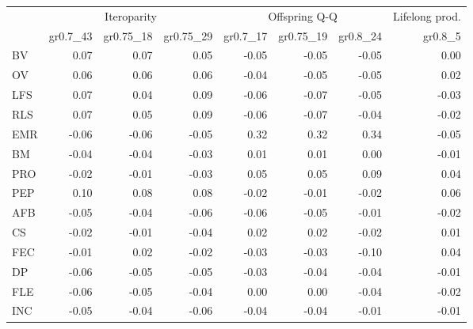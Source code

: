 \begin{landscape}
\begin{table}
\begin{footnotesize}
\begin{tabular}{@{}l|rrr|rrr|r@{}}
\toprule
 & \multicolumn{3}{c|}{Iteroparity} & \multicolumn{3}{c|}{Offspring Q-Q} & \multicolumn{1}{c}{Lifelong prod.}\\
 & gr0.7\_43 & gr0.75\_18 & gr0.75\_29 & gr0.7\_17 & gr0.75\_19 & gr0.8\_24 & gr0.8\_5\\
\midrule
BV & 0.07 & 0.07 & 0.05 & -0.05 & -0.05 & -0.05 & 0.00\\
OV & 0.06 & 0.06 & 0.06 & -0.04 & -0.05 & -0.05 & 0.02\\
LFS & 0.07 & 0.04 & 0.09 & -0.06 & -0.07 & -0.05 & -0.03\\
RLS & 0.07 & 0.05 & 0.09 & -0.06 & -0.07 & -0.04 & -0.02\\
EMR & -0.06 & -0.06 & -0.05 & 0.32 & 0.32 & 0.34 & -0.05\\
BM & -0.04 & -0.04 & -0.03 & 0.01 & 0.01 & 0.00 & -0.01\\
PRO & -0.02 & -0.01 & -0.03 & 0.05 & 0.05 & 0.09 & 0.04\\
PEP & 0.10 & 0.08 & 0.08 & -0.02 & -0.01 & -0.02 & 0.06\\
AFB & -0.05 & -0.04 & -0.06 & -0.06 & -0.05 & -0.01 & -0.02\\
CS & -0.02 & -0.01 & -0.04 & 0.02 & 0.02 & -0.02 & 0.01\\
FEC & -0.01 & 0.02 & -0.02 & -0.03 & -0.03 & -0.10 & 0.04\\
DP & -0.06 & -0.05 & -0.05 & -0.03 & -0.04 & -0.04 & -0.01\\
FLE & -0.06 & -0.05 & -0.04 & 0.00 & 0.00 & -0.04 & -0.02\\
INC & -0.05 & -0.04 & -0.06 & -0.04 & -0.04 & -0.01 & -0.01\\
\bottomrule
\end{tabular}
\end{footnotesize}
\end{table}

\end{landscape}


